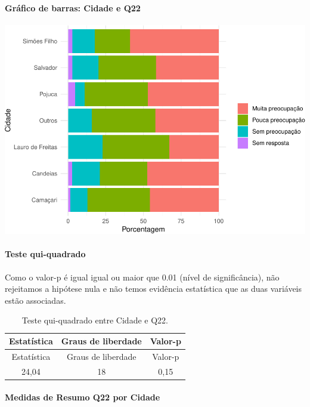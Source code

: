 \documentclass[]{article}
\let\oldparagraph\paragraph
\renewcommand{\paragraph}[1]{\oldparagraph{#1}\mbox{}}
\begin{document}
\hypertarget{gruxe1fico-de-barras-cidade-e-q22}{%
\paragraph{Gráfico de barras: Cidade e Q22}\label{gruxe1fico-de-barras-cidade-e-q22}}

\begin{center}\includegraphics[width=0.75\linewidth]{relatorio_covid19_files/figure-latex/unnamed-chunk-485-1} \end{center}

\hypertarget{teste-qui-quadrado-42}{%
\paragraph{Teste qui-quadrado}\label{teste-qui-quadrado-42}}

Como o valor-p é igual igual ou maior que 0.01 (nível de significância), não rejeitamos a hipótese nula e não temos evidência estatística que as duas variáveis estão associadas.

\begin{longtable}[]{@{}ccc@{}}
\caption{\label{tab:unnamed-chunk-487}Teste qui-quadrado entre Cidade e Q22.}\tabularnewline
\toprule
Estatística & Graus de liberdade & Valor-p\tabularnewline
\midrule
\endfirsthead
\toprule
Estatística & Graus de liberdade & Valor-p\tabularnewline
\midrule
\endhead
24,04 & 18 & 0,15\tabularnewline
\bottomrule
\end{longtable}

\cleardoublepage

\hypertarget{medidas-de-resumo-q22-por-cidade}{%
\paragraph{Medidas de Resumo Q22 por Cidade}\label{medidas-de-resumo-q22-por-cidade}}
\end{document}
